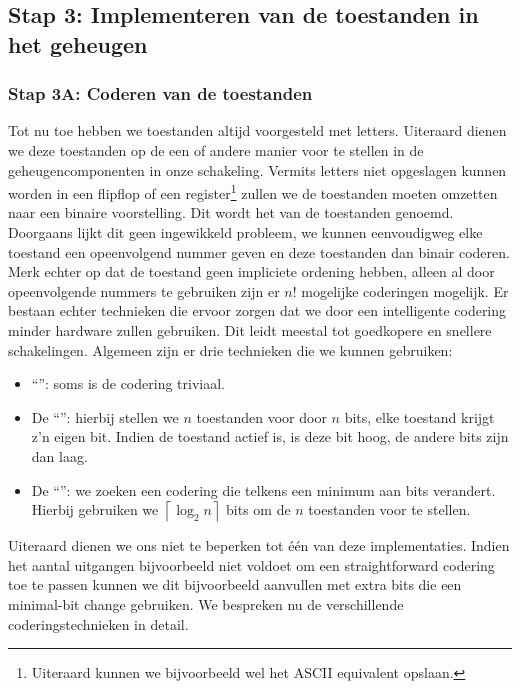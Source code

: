 \subsection{Stap 3: Implementeren van de toestanden in het geheugen}
\subsubsection{Stap 3A: Coderen van de toestanden}
\label{term:minimalBitChange}
\label{term:grayCodeCounter}
Tot nu toe hebben we toestanden altijd voorgesteld met letters. Uiteraard dienen we deze toestanden op de een of andere manier voor te stellen in de geheugencomponenten in onze schakeling. Vermits letters niet opgeslagen kunnen worden in een flipflop of een register\footnote{Uiteraard kunnen we bijvoorbeeld wel het ASCII equivalent opslaan.} zullen we de toestanden moeten omzetten naar een binaire voorstelling. Dit wordt het  van de toestanden genoemd. Doorgaans lijkt dit geen ingewikkeld probleem, we kunnen eenvoudigweg elke toestand een opeenvolgend nummer geven en deze toestanden dan binair coderen. Merk echter op dat de toestand geen impliciete ordening hebben, alleen al door opeenvolgende nummers te gebruiken zijn er $n!$ mogelijke coderingen mogelijk. Er bestaan echter technieken die ervoor zorgen dat we door een intelligente codering minder hardware zullen gebruiken. Dit leidt meestal tot goedkopere en snellere schakelingen. Algemeen zijn er drie technieken die we kunnen gebruiken:
\begin{itemize}
 \item ``'': soms is de codering triviaal.
 \item De ``'': hierbij stellen we $n$ toestanden voor door $n$ bits, elke toestand krijgt z'n eigen bit. Indien de toestand actief is, is deze bit hoog, de andere bits zijn dan laag.
 \item De ``'': we zoeken een codering die telkens een minimum aan bits verandert. Hierbij gebruiken we $\left\lceil\log_2 n\right\rceil$ bits om de $n$ toestanden voor te stellen.
\end{itemize}
Uiteraard dienen we ons niet te beperken tot \'e\'en van deze implementaties. Indien het aantal uitgangen bijvoorbeeld niet voldoet om een straightforward codering toe te passen kunnen we dit bijvoorbeeld aanvullen met extra bits die een minimal-bit change gebruiken. We bespreken nu de verschillende coderingstechnieken in detail.
